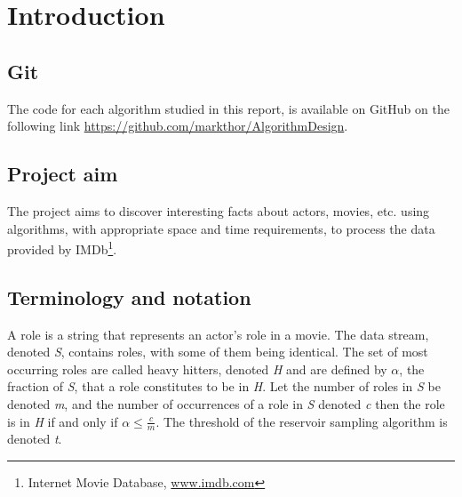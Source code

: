 
\section{Introduction}

\subsection{Git}
The code for each algorithm studied in this report, is available on GitHub on the following link \url{https://github.com/markthor/AlgorithmDesign}.

\subsection{Project aim}
The project aims to discover interesting facts about actors, movies, etc. using algorithms, with appropriate space and time requirements, to process the data provided by IMDb\footnote{Internet Movie Database, \url{www.imdb.com}}.

\subsection{Terminology and notation}
A role is a string that represents an actor’s role in a movie. The data stream, denoted \textit{S}, contains roles, with some of them being identical. The set of most occurring roles are called heavy hitters, denoted \textit{H} and are defined by \(\alpha\), the fraction of \textit{S}, that a role constitutes to be in \textit{H}.
Let the number of roles in \textit{S} be denoted \textit{m}, and the number of occurrences of a role in \textit{S} denoted \textit{c} then the role is in \textit{H} if and only if \(\alpha \le \frac{c}{m}\). The threshold of the reservoir sampling algorithm is denoted \textit{t}.

